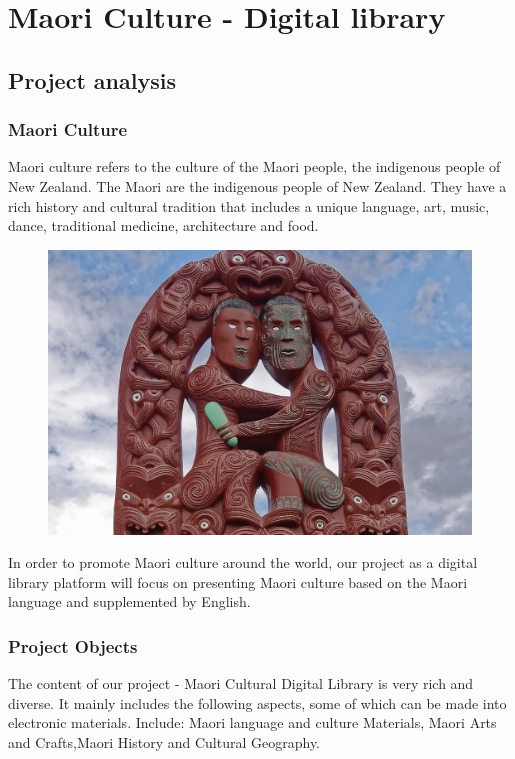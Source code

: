 \chapter{Maori Culture - Digital library}

\section{Project analysis}
\subsection{Maori Culture}
Maori culture refers to the culture of the Maori people, the indigenous people of New Zealand. The Maori are the indigenous people of New Zealand. They have a rich history and cultural tradition that includes a unique language, art, music, dance, traditional medicine, architecture and food.

\begin{figure}[htbp]
  \centerline{\includegraphics[width=500pt]{images/1-1.jpg}}
\end{figure}

In order to promote Maori culture around the world, our project as a digital library platform will focus on presenting Maori culture based on the Maori language and supplemented by English.

\subsection{Project Objects}
The content of our project - Maori Cultural Digital Library is very rich and diverse. It mainly includes the following aspects, some of which can be made into electronic materials. Include: Maori language and culture Materials, Maori Arts and Crafts,Maori History and Cultural Geography.

